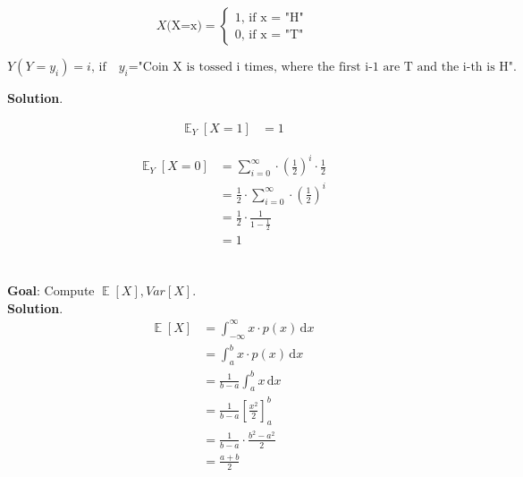 \documentclass[11pt]{article}
\newcommand{\exercise}{\section{}}
\DeclareMathOperator{\E}{\mathbb{E}}
\newcommand{\intf}[4]{\int_{#1}^{#2} \! #3 \, \mathrm{d}#4}
\begin{document}
\exercise


\begin{equation*}
X(\text{X=x)} = \begin{cases}
  1 \text{, if x = "H"} \\
  0 \text{, if x = "T"}
\end{cases}
\end{equation*}

$$Y(Y=y_i) = i \text{, if} \quad y_i \text{="Coin X is tossed i times, where the first i-1 are T and the i-th is H"}.$$

\noindent \textbf{Solution}.

\begin{align*}
\E_Y[X=1] &= 1 \tag{by problem statement}
\end{align*}

\begin{align*}
\E_Y[X=0] &= \sum_{i=0}^{\infty} \cdot (\frac{1}{2})^i \cdot \frac{1}{2} \tag{by expectation definition} \\
&= \frac{1}{2} \cdot \sum_{i=0}^{\infty} \cdot (\frac{1}{2})^i \\
&= \frac{1}{2} \cdot \frac{1}{1 - \frac{1}{2}} \tag{by geometric series definition} \\
&= 1
\end{align*}

\exercise

\textbf{Goal}: Compute $\E[X], Var[X]$. \\
\noindent \textbf{Solution}.
\begin{align*}
\E[X] &= \intf{-\infty}{\infty}{x \cdot p(x)}{x} \tag{by definition expectation of continous random variable} \\
&= \intf{a}{b}{x \cdot p(x)}{x} \tag{by definition p(x) is zero outside these boundaries} \\
&= \frac{1}{b-a} \intf{a}{b}{x}{x} \\
&= \frac{1}{b-a} \left[\frac{x^2}{2} \right]_a^b \\
&= \frac{1}{b-a} \cdot \frac{b^2 - a^2}{2} \\
&= \frac{a+b}{2}
\end{align*}
\end{document}
